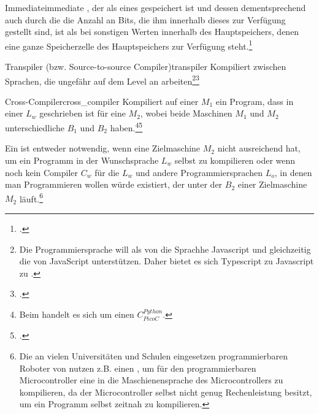 \begin{Definition}{Immediate}{immediate}
  , der als  eines  gespeichert ist und dessen  dementsprechend auch durch die die Anzahl an Bits, die ihm innerhalb dieses  zur Verfügung gestellt sind,  ist als bei sonstigen Werten innerhalb des Hauptspeichers, denen eine ganze Speicherzelle des Hauptspeichers zur Verfügung steht.\footcite{ljohhuh_what_2018}
\end{Definition}

\begin{Definition}{Transpiler (bzw. Source-to-source Compiler)}{transpiler}
  Kompiliert zwischen Sprachen, die ungefähr auf dem  Level an  arbeiten\footnote{Die Programmiersprache  will als  von  die Sprachhe Javascript  und gleichzeitig die  von JavaScript unterstützen. Daher bietet es sich Typescript zu Javascript zu .}\footcite{thiemann_compilerbau_2021}
\end{Definition}

\begin{Definition}{Cross-Compiler}{cross_compiler}
  Kompiliert auf einer  $M_1$ ein Program, dass in einer  $L_w$ geschrieben ist für eine  $M_2$, wobei beide Maschinen $M_1$ und $M_2$ unterschiedliche  $B_1$ und $B_2$ haben.\footnote{Beim  handelt es sich um einen  $C_{PicoC}^{Python}$.}\footcite{earley_formalism_1970}
\end{Definition}

Ein  ist entweder notwendig, wenn eine Zielmaschine $M_2$ nicht ausreichend  hat, um ein Programm in der Wunschsprache $L_w$ selbst  zu kompilieren oder wenn noch kein Compiler $C_w$ für die  $L_w$ und andere Programmiersprachen $L_o$, in denen man Programmieren wollen würde existiert, der unter der  $B_2$ einer Zielmaschine $M_2$ läuft.\footnote{Die an vielen Universitäten und Schulen eingesetzen programmierbaren Roboter von  nutzen z.B. einen , um für den programmierbaren Microcontroller eine  in die Maschienensprache des Microcontrollers zu kompilieren, da der Microcontroller selbst nicht genug Rechenleistung besitzt, um ein Programm selbst zeitnah zu kompilieren.}

